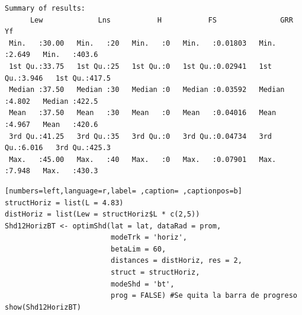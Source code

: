 \begin{verbatim}
Summary of results:
      Lew             Lns           H           FS               GRR              Yf       
 Min.   :30.00   Min.   :20   Min.   :0   Min.   :0.01803   Min.   :2.649   Min.   :403.6  
 1st Qu.:33.75   1st Qu.:25   1st Qu.:0   1st Qu.:0.02941   1st Qu.:3.946   1st Qu.:417.5  
 Median :37.50   Median :30   Median :0   Median :0.03592   Median :4.802   Median :422.5  
 Mean   :37.50   Mean   :30   Mean   :0   Mean   :0.04016   Mean   :4.967   Mean   :420.6  
 3rd Qu.:41.25   3rd Qu.:35   3rd Qu.:0   3rd Qu.:0.04734   3rd Qu.:6.016   3rd Qu.:425.3  
 Max.   :45.00   Max.   :40   Max.   :0   Max.   :0.07901   Max.   :7.948   Max.   :430.3
\end{verbatim}

\begin{lstlisting}[numbers=left,language=r,label= ,caption= ,captionpos=b]
structHoriz = list(L = 4.83)
distHoriz = list(Lew = structHoriz$L * c(2,5))
Shd12HorizBT <- optimShd(lat = lat, dataRad = prom,
                         modeTrk = 'horiz',
                         betaLim = 60,
                         distances = distHoriz, res = 2,
                         struct = structHoriz,
                         modeShd = 'bt',
                         prog = FALSE) #Se quita la barra de progreso
show(Shd12HorizBT)
\end{lstlisting}

